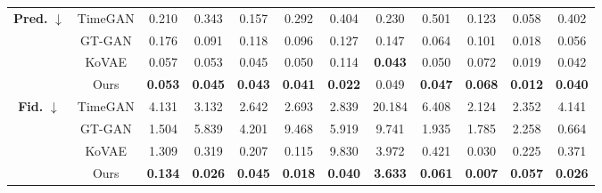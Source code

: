 \documentclass{article}
\theoremstyle{plain}
\theoremstyle{definition}
\theoremstyle{remark}
\begin{document}
\begin{table}[!t]
{\begin{tabular}{cc|cccccccccc}
    \multirow{4}{*}{\textbf{Pred.} $\downarrow$} 
      & TimeGAN 
         & 0.210 
         & 0.343 
         & 0.157 
         & 0.292 
         & 0.404 
         & 0.230 
         & 0.501 
         & 0.123 
         & 0.058 
         & 0.402 \\
      & GT-GAN  
         & 0.176 
         & 0.091 
         & 0.118 
         & 0.096 
         & 0.127 
         & 0.147 
         & 0.064 
         & 0.101 
         & 0.018 
         & 0.056 \\
      & KoVAE   
         & 0.057 
         & 0.053 
         & 0.045 
         & 0.050 
         & 0.114 
         & \cellcolor{blue!10}\textbf{0.043}
         & 0.050 
         & 0.072 
         & 0.019 
         & 0.042 \\
      & Ours    
         & \cellcolor{blue!10}\textbf{0.053}
         & \cellcolor{blue!10}\textbf{0.045}
         & \cellcolor{blue!10}\textbf{0.043}
         & \cellcolor{blue!10}\textbf{0.041}
         & \cellcolor{blue!10}\textbf{0.022}
         & 0.049
         & \cellcolor{blue!10}\textbf{0.047}
         & \cellcolor{blue!10}\textbf{0.068}
         & \cellcolor{blue!10}\textbf{0.012}
         & \cellcolor{blue!10}\textbf{0.040} \\
    \midrule
    
    \multirow{4}{*}{\textbf{Fid.} $\downarrow$} 
      & TimeGAN 
         & 4.131 
         & 3.132 
         & 2.642 
         & 2.693 
         & 2.839 
         & 20.184 
         & 6.408 
         & 2.124 
         & 2.352 
         & 4.141 \\
      & GT-GAN  
         & 1.504 
         & 5.839 
         & 4.201 
         & 9.468 
         & 5.919 
         & 9.741 
         & 1.935 
         & 1.785 
         & 2.258 
         & 0.664 \\
      & KoVAE   
         & 1.309 
         & 0.319 
         & 0.207 
         & 0.115 
         & 9.830 
         & 3.972
         & 0.421 
         & 0.030 
         & 0.225 
         & 0.371 \\
      & Ours    
         & \cellcolor{blue!10}\textbf{0.134}
         & \cellcolor{blue!10}\textbf{0.026}
         & \cellcolor{blue!10}\textbf{0.045}
         & \cellcolor{blue!10}\textbf{0.018}
         & \cellcolor{blue!10}\textbf{0.040}
         & \cellcolor{blue!10}\textbf{3.633}
         & \cellcolor{blue!10}\textbf{0.061}
         & \cellcolor{blue!10}\textbf{0.007}
         & \cellcolor{blue!10}\textbf{0.057}
         & \cellcolor{blue!10}\textbf{0.026} \\
    \midrule


\end{tabular}}
\end{table}
\end{document}
